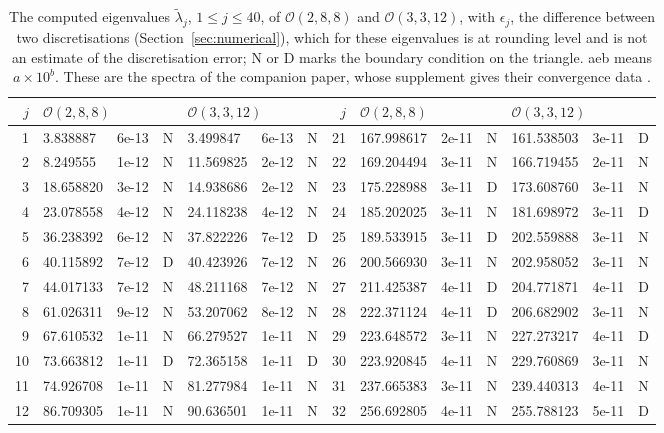 \documentclass[pdflatex,sn-mathphys-num]{sn-jnl}
\theoremstyle{thmstyleone}%
\theoremstyle{thmstylethree}%
\newcommand{\Orb}{\mathcal{O}}
\begin{document}
\begin{table}[t]
\centering\scriptsize
\caption{The computed eigenvalues $\tilde\lambda_j$, $1\le j\le40$, of $\Orb(2,8,8)$ and $\Orb(3,3,12)$, with $\epsilon_j$, the difference between two discretisations (Section~\ref{sec:numerical}), which for these eigenvalues is at rounding level and is not an estimate of the discretisation error; N or D marks the boundary condition on the triangle. aeb means $a\times10^b$. These are the spectra of the companion paper, whose supplement gives their convergence data \cite{companionA}.}\label{tab:spectra}
\setlength{\tabcolsep}{2pt}\begin{tabular}{@{}rllllll|rllllll@{}}
\toprule
$j$ & \multicolumn{3}{l}{$\Orb(2,8,8)$} & \multicolumn{3}{l|}{$\Orb(3,3,12)$} & $j$ & \multicolumn{3}{l}{$\Orb(2,8,8)$} & \multicolumn{3}{l}{$\Orb(3,3,12)$}\\
\midrule
1 & 3.838887 & 6e-13 & N & 3.499847 & 6e-13 & N & 21 & 167.998617 & 2e-11 & N & 161.538503 & 3e-11 & D\\
2 & 8.249555 & 1e-12 & N & 11.569825 & 2e-12 & N & 22 & 169.204494 & 3e-11 & N & 166.719455 & 2e-11 & N\\
3 & 18.658820 & 3e-12 & N & 14.938686 & 2e-12 & N & 23 & 175.228988 & 3e-11 & D & 173.608760 & 3e-11 & N\\
4 & 23.078558 & 4e-12 & N & 24.118238 & 4e-12 & N & 24 & 185.202025 & 3e-11 & N & 181.698972 & 3e-11 & D\\
5 & 36.238392 & 6e-12 & N & 37.822226 & 7e-12 & D & 25 & 189.533915 & 3e-11 & D & 202.559888 & 3e-11 & N\\
6 & 40.115892 & 7e-12 & D & 40.423926 & 7e-12 & N & 26 & 200.566930 & 3e-11 & N & 202.958052 & 3e-11 & N\\
7 & 44.017133 & 7e-12 & N & 48.211168 & 7e-12 & N & 27 & 211.425387 & 4e-11 & D & 204.771871 & 4e-11 & D\\
8 & 61.026311 & 9e-12 & N & 53.207062 & 8e-12 & N & 28 & 222.371124 & 4e-11 & D & 206.682902 & 3e-11 & N\\
9 & 67.610532 & 1e-11 & N & 66.279527 & 1e-11 & N & 29 & 223.648572 & 3e-11 & N & 227.273217 & 4e-11 & D\\
10 & 73.663812 & 1e-11 & D & 72.365158 & 1e-11 & D & 30 & 223.920845 & 4e-11 & N & 229.760869 & 3e-11 & N\\
11 & 74.926708 & 1e-11 & N & 81.277984 & 1e-11 & N & 31 & 237.665383 & 3e-11 & N & 239.440313 & 4e-11 & N\\
12 & 86.709305 & 1e-11 & N & 90.636501 & 1e-11 & N & 32 & 256.692805 & 4e-11 & N & 255.788123 & 5e-11 & D\\

\end{tabular}
\end{table}
\end{document}
